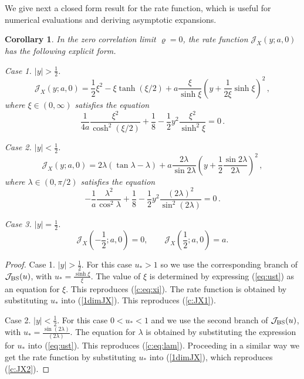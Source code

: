 \documentclass[11pt]{article}
\numberwithin{equation}{section}
\theoremstyle{plain}
\newtheorem{corollary}[theorem]{Corollary}
\begin{document}
We give next a closed form result for the rate function, which is useful
for numerical evaluations and deriving asymptotic expansions.

\begin{corollary}\label{corr:JXrho0}
In the zero correlation limit $\varrho = 0$, 
the rate function $\mathcal{J}_X(y;a,0)$ has the following explicit form.

Case 1. $|y|>\frac12 $.
\begin{equation}\label{c:JX1}
\mathcal{J}_X(y;a,0) = \frac12 \xi^2 - \xi\tanh(\xi/2) + a 
\frac{\xi}{\sinh \xi} \left(y + \frac{1}{2\xi}\sinh\xi\right)^2\,,
\end{equation}
where $\xi\in(0,\infty)$ satisfies the equation
\begin{equation}\label{c:eq:xi}
\frac{1}{4a} \frac{\xi^2}{\cosh^2(\xi/2)} + \frac18 - 
\frac12 y^2 \frac{\xi^2}{\sinh^2\xi} = 0\,.
\end{equation}

Case 2.  $|y|<\frac12 $. 
\begin{equation}\label{c:JX2}
\mathcal{J}_X(y;a,0) = 2\lambda (\tan\lambda - \lambda) + a 
\frac{2\lambda}{\sin 2\lambda} 
\left(y + \frac{1}{2} \frac{\sin 2\lambda}{2\lambda}\right)^2\,,
\end{equation}
where $\lambda\in(0,\pi/2)$ satisfies the equation
\begin{equation}\label{c:eq:lam}
-\frac{1}{a} \frac{\lambda^2}{\cos^2\lambda} + \frac18 - 
\frac12 y^2 \frac{(2\lambda)^2}{\sin^2(2\lambda)} = 0\,.
\end{equation}

Case 3. $|y|=\frac{1}{2}$.
\begin{equation}
\mathcal{J}_{X}\left(-\frac{1}{2};a,0\right)=0,
\qquad
\mathcal{J}_{X}\left(\frac{1}{2};a,0\right)=a.
\end{equation}
\end{corollary}

\begin{proof}
Case 1. $|y| > \frac12$. For this case $u_*>1$ so we use the corresponding branch of $\mathcal{J}_{\rm BS}(u)$, with $u_* = \frac{\sinh\xi}{\xi}$. The value of $\xi$ is determined by expressing (\ref{eq:ust})
as an equation for $\xi$. This reproduces (\ref{c:eq:xi}).
The rate function is obtained by substituting $u_*$ into (\ref{1dimJX}). This reproduces (\ref{c:JX1}).

Case 2. $|y| < \frac12$. For this case $0 < u_* < 1$ and we use the second branch of 
$\mathcal{J}_{\rm BS}(u)$, with $u_* = \frac{\sin(2\lambda)}{(2\lambda)}$. The equation for $\lambda$
is obtained by substituting the expression for $u_*$ into (\ref{eq:ust}). This reproduces (\ref{c:eq:lam}).
Proceeding in a similar way we get the rate function by substituting $u_*$ into (\ref{1dimJX}),
which reproduces (\ref{c:JX2}).
\end{proof}
\end{document}
